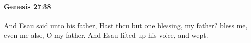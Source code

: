 
		\paragraph{Genesis 27:38} %
			\label{GENESIS-27-38}

			And Esau said unto his father, Hast thou but one blessing, my father? bless me, even me also, O my father. And Esau lifted up his voice, and wept.


